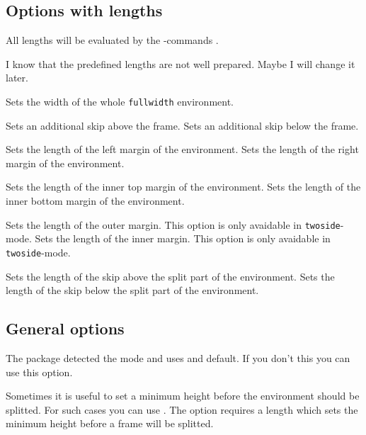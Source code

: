 \documentclass[parskip=false,english,11pt]{ltxmdf}
\def\fwdname{\texttt{fullwidth}\xspace}
\begin{document}
\subsection{Options with lengths}

All lengths will be evaluated by the \eTeX-commands .

I know that the predefined lengths are not well prepared. Maybe I will change it later.


 Sets the width of the whole \fwdname environment.

 Sets an additional skip above the frame.
 Sets an additional skip below the frame.

 Sets the length of the left margin of the environment.
 Sets the length of the right margin of the environment.

 Sets the length of the inner top margin of the environment.
 Sets the length of the inner bottom margin of the environment.

 Sets the length of the outer margin. This option is only avaidable in \texttt{twoside}-mode.
 Sets the length of the inner margin. This option is only avaidable in \texttt{twoside}-mode.


 Sets the length of the skip above the split part of the environment.
 Sets the length of the skip below the split part of the environment.


\subsection{General options}\label{genopt}

 The package detected the  mode and uses  and  default. If you don't this you can use this option.

 Sometimes it is useful to set a minimum height before the environment should be splitted. For such cases you can use . The option requires a length which sets the minimum height before a frame will be splitted.
\end{document}
